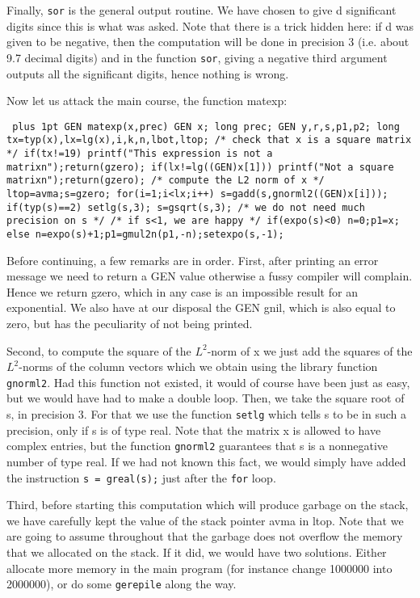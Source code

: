 Finally, {\tt sor} is the general output routine. We have chosen
to give d significant digits since this is what was asked. Note that there is
a trick hidden here: if d was given to be negative, then the computation will
be done in precision 3 (i.e. about 9.7 decimal digits) and in the function
{\tt sor}, giving a negative third argument outputs all the significant digits,
hence nothing is wrong.

Now let us attack the main course, the function matexp:

{\tt \obeylines\parskip=0pt plus 1pt
\hbox{}
GEN matexp(x,prec)
\qquad GEN x;
\qquad long prec;
\hbox{}
\obr
\quad GEN y,r,s,p1,p2;
\quad long tx=typ(x),lx=lg(x),i,k,n,lbot,ltop;
\hbox{}
/* check that x is a square matrix */
\hbox{}
\quad if(tx!=19) \obr printf("This expression is not a matrix\bs n");return(gzero);\cbr 
\quad if(lx!=lg((GEN)x[1])) \obr printf("Not a square matrix\bs n");return(gzero);\cbr 
\hbox{}
/* compute the L2 norm of x */
\hbox{}
\quad ltop=avma;s=gzero;
\quad for(i=1;i<lx;i++) s=gadd(s,gnorml2((GEN)x[i]));
\quad if(typ(s)==2) setlg(s,3);
\quad s=gsqrt(s,3); /* we do not need much precision on s */
\hbox{}
/* if s<1, we are happy */
\hbox{}
\quad if(expo(s)<0) \obr n=0;p1=x;\cbr 
\quad else \obr n=expo(s)+1;p1=gmul2n(p1,-n);setexpo(s,-1);\cbr 
}

Before continuing, a few remarks are in order. First, after printing an error
message we need to return a GEN value otherwise a fussy compiler will complain.
Hence we return gzero, which in any case is an impossible result for an
exponential. We also have at our disposal the GEN gnil, which is also equal
to zero, but has the peculiarity of not being printed.

Second, to compute the square of the $L^2$-norm of x we just add the
squares of the $L^2$-norms of the column vectors which we obtain using the
library function {\tt gnorml2}. Had this function not existed, it would
of course have been just as easy, but we would have had to make a double loop.
Then, we take the square root of s, in precision 3. For that we use the function
{\tt setlg} which tells s to be in such a precision, only if s is of type real.
Note that the matrix x is allowed to have complex entries, but the function
{\tt gnorml2} guarantees that s is a nonnegative number of type real.
If we had not known this fact, we would simply have added
the instruction {\tt s = greal(s);} just after the {\tt for} loop.

Third, before starting this computation which will produce garbage on the stack,
we have carefully kept the value of the stack pointer avma in ltop. Note that
we are going to assume throughout that the garbage does not overflow the
memory that we allocated on the stack. If it did, we would have two solutions.
Either allocate more memory in the main program (for instance change 1000000
into 2000000), or do some {\tt gerepile} along the way.

